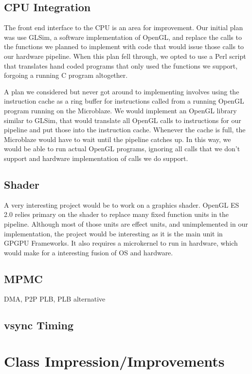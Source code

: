 \documentclass[letterpaper,10pt]{article}
\begin{document}
\subsection{CPU Integration}
The front end interface to the CPU is an area for improvement. Our initial plan was use GLSim, a software implementation of OpenGL, and replace the calls to the functions we planned to implement with code that would issue those calls to our hardware pipeline. When this plan fell through, we opted to use a Perl script that translates hand coded programs that only used the functions we support, forgoing a running C program altogether.

A plan we considered but never got around to implementing involves using the instruction cache as a ring buffer for instructions called from a running OpenGL program running on the Microblaze. We would implement an OpenGL library similar to GLSim, that would translate all OpenGL calls to instructions for our pipeline and put those into the instruction cache. Whenever the cache is full, the Microblaze would have to wait until the pipeline catches up. In this way, we would be able to run actual OpenGL programs, ignoring all calls that we don't support and hardware implementation of calls we do support.

\subsection{Shader}
A very interesting project would be to work on a graphics shader.  OpenGL ES 2.0 relies primary on the shader to replace many fixed function units in the pipeline.  Although most of those units are effect units, and unimplemented in our implementation, the project would be interesting as it is the main unit in GPGPU Frameworks.  It also requires a microkernel to run in hardware, which would make for a interesting fusion of OS and hardware.

\subsection{MPMC}
DMA, P2P PLB, PLB alternative

\subsection{vsync Timing}

\section{Class Impression/Improvements}
\end{document}
